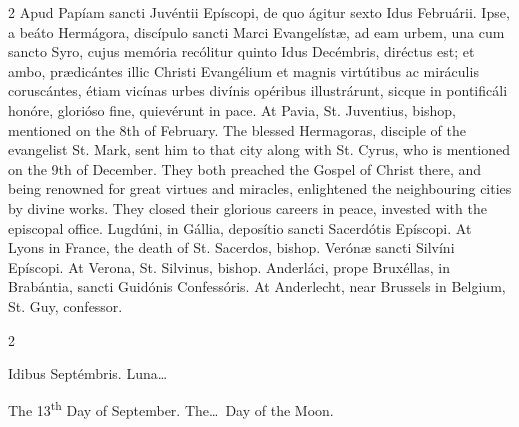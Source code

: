 \begin{paracol}{2}
\switchcolumn*
{}
Apud Papíam sancti 
 Juvéntii Epíscopi, de quo ágitur sexto Idus Februárii. Ipse, a beáto 
 Hermágora, discípulo sancti Marci Evangelístæ, ad eam urbem, una cum sancto 
 Syro, cujus memória recólitur quinto Idus Decémbris, diréctus est; et ambo, 
 prædicántes illic Christi Evangélium et magnis virtútibus ac miráculis 
 coruscántes, étiam vicínas urbes divínis opéribus illustrárunt, sicque in 
 pontificáli honóre, glorióso fine, quievérunt in pace.
\switchcolumn
{}
At Pavia, St. Juventius, bishop, 
 mentioned on the 8th of February. The blessed Hermagoras, disciple of 
 the evangelist St. Mark, sent him to that city along with St. Cyrus, who is 
 mentioned on the 9th of December. They both preached the Gospel of 
 Christ there, and being renowned for great virtues and miracles, enlightened 
 the neighbouring cities by divine works. They closed their glorious 
 careers in peace, invested with the episcopal office.
\switchcolumn*
{}
Lugdúni, in Gállia, 
 deposítio sancti Sacerdótis Epíscopi.
\switchcolumn
{}
At Lyons in France, the death of St. 
 Sacerdos, bishop.
\switchcolumn*
{}
Verónæ sancti Silvíni 
 Epíscopi.
\switchcolumn
{}
At Verona, St. Silvinus, bishop.
\switchcolumn*
{}
Anderláci, prope 
 Bruxéllas, in Brabántia, sancti Guidónis Confessóris.
\switchcolumn
{}
At Anderlecht, near Brussels in 
 Belgium, St. Guy, confessor.
\switchcolumn*
{}
\end{paracol}


\begin{paracol}{2}
\begin{center}{\color{gregoriocolor} Idibus Septémbris. 
 Luna\dots\ }\end{center}
\switchcolumn
{}
\begin{center}{\color{gregoriocolor} The   13\textsuperscript{th} Day of 
 September. The\dots\ Day of the Moon.}\end{center}
\end{paracol}

